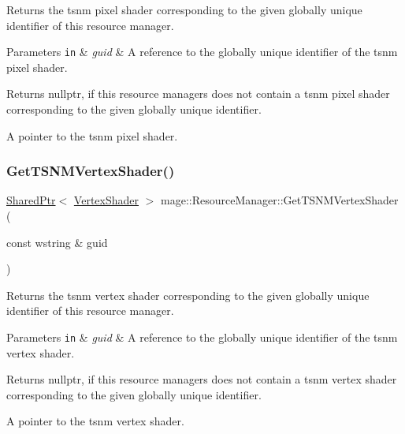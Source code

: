Returns the tsnm pixel shader corresponding to the given globally unique identifier of this resource manager.


\begin{DoxyParams}[1]{Parameters}
\mbox{\tt in}  & {\em guid} & A reference to the globally unique identifier of the tsnm pixel shader. \\
\hline
\end{DoxyParams}
\begin{DoxyReturn}{Returns}
{\ttfamily nullptr}, if this resource managers does not contain a tsnm pixel shader corresponding to the given globally unique identifier. 

A pointer to the tsnm pixel shader. 
\end{DoxyReturn}
\hypertarget{classmage_1_1_resource_manager_a3d0d4eb02b76a865117392d2db6de44d}{}\label{classmage_1_1_resource_manager_a3d0d4eb02b76a865117392d2db6de44d} 
\subsubsection{\texorpdfstring{Get\+T\+S\+N\+M\+Vertex\+Shader()}{GetTSNMVertexShader()}}
{\footnotesize\ttfamily \hyperlink{namespacemage_a1e01ae66713838a7a67d30e44c67703e}{Shared\+Ptr}$<$ \hyperlink{classmage_1_1_vertex_shader}{Vertex\+Shader} $>$ mage\+::\+Resource\+Manager\+::\+Get\+T\+S\+N\+M\+Vertex\+Shader (\begin{DoxyParamCaption}\item[{const wstring \&}]{guid }\end{DoxyParamCaption})\hspace{0.3cm}{\ttfamily [noexcept]}}

Returns the tsnm vertex shader corresponding to the given globally unique identifier of this resource manager.


\begin{DoxyParams}[1]{Parameters}
\mbox{\tt in}  & {\em guid} & A reference to the globally unique identifier of the tsnm vertex shader. \\
\hline
\end{DoxyParams}
\begin{DoxyReturn}{Returns}
{\ttfamily nullptr}, if this resource managers does not contain a tsnm vertex shader corresponding to the given globally unique identifier. 

A pointer to the tsnm vertex shader. 
\end{DoxyReturn}
\hypertarget{classmage_1_1_resource_manager_ac54eb6fd61322a66bdc704a88eca192d}{}\label{classmage_1_1_resource_manager_ac54eb6fd61322a66bdc704a88eca192d} 
